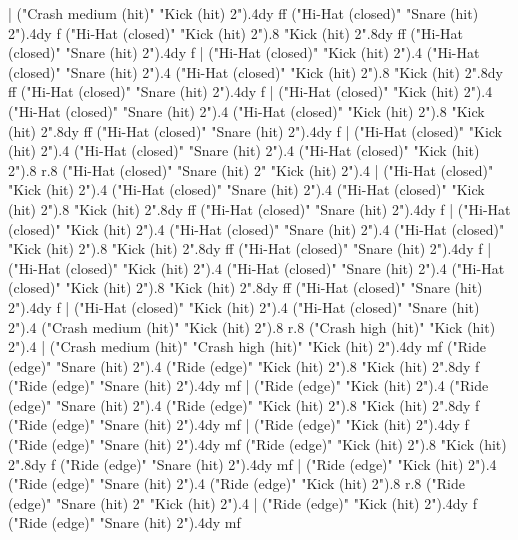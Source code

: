     |
      ("Crash medium (hit)" "Kick (hit) 2").4{dy ff}
      ("Hi-Hat (closed)" "Snare (hit) 2").4{dy f}
      ("Hi-Hat (closed)" "Kick (hit) 2").8
      "Kick (hit) 2".8{dy ff}
      ("Hi-Hat (closed)" "Snare (hit) 2").4{dy f}
    |
      ("Hi-Hat (closed)" "Kick (hit) 2").4
      ("Hi-Hat (closed)" "Snare (hit) 2").4
      ("Hi-Hat (closed)" "Kick (hit) 2").8
      "Kick (hit) 2".8{dy ff}
      ("Hi-Hat (closed)" "Snare (hit) 2").4{dy f}
    |
      ("Hi-Hat (closed)" "Kick (hit) 2").4
      ("Hi-Hat (closed)" "Snare (hit) 2").4
      ("Hi-Hat (closed)" "Kick (hit) 2").8
      "Kick (hit) 2".8{dy ff}
      ("Hi-Hat (closed)" "Snare (hit) 2").4{dy f}
    |
      ("Hi-Hat (closed)" "Kick (hit) 2").4
      ("Hi-Hat (closed)" "Snare (hit) 2").4
      ("Hi-Hat (closed)" "Kick (hit) 2").8
      r.8
      ("Hi-Hat (closed)" "Snare (hit) 2" "Kick (hit) 2").4
    |
      ("Hi-Hat (closed)" "Kick (hit) 2").4
      ("Hi-Hat (closed)" "Snare (hit) 2").4
      ("Hi-Hat (closed)" "Kick (hit) 2").8
      "Kick (hit) 2".8{dy ff}
      ("Hi-Hat (closed)" "Snare (hit) 2").4{dy f}
    |
      ("Hi-Hat (closed)" "Kick (hit) 2").4
      ("Hi-Hat (closed)" "Snare (hit) 2").4
      ("Hi-Hat (closed)" "Kick (hit) 2").8
      "Kick (hit) 2".8{dy ff}
      ("Hi-Hat (closed)" "Snare (hit) 2").4{dy f}
    |
      ("Hi-Hat (closed)" "Kick (hit) 2").4
      ("Hi-Hat (closed)" "Snare (hit) 2").4
      ("Hi-Hat (closed)" "Kick (hit) 2").8
      "Kick (hit) 2".8{dy ff}
      ("Hi-Hat (closed)" "Snare (hit) 2").4{dy f}
    |
      ("Hi-Hat (closed)" "Kick (hit) 2").4
      ("Hi-Hat (closed)" "Snare (hit) 2").4
      ("Crash medium (hit)" "Kick (hit) 2").8
      r.8
      ("Crash high (hit)" "Kick (hit) 2").4
    |
      ("Crash medium (hit)" "Crash high (hit)" "Kick (hit) 2").4{dy mf}
      ("Ride (edge)" "Snare (hit) 2").4
      ("Ride (edge)" "Kick (hit) 2").8
      "Kick (hit) 2".8{dy f}
      ("Ride (edge)" "Snare (hit) 2").4{dy mf}
    |
      ("Ride (edge)" "Kick (hit) 2").4
      ("Ride (edge)" "Snare (hit) 2").4
      ("Ride (edge)" "Kick (hit) 2").8
      "Kick (hit) 2".8{dy f}
      ("Ride (edge)" "Snare (hit) 2").4{dy mf}
    |
      ("Ride (edge)" "Kick (hit) 2").4{dy f}
      ("Ride (edge)" "Snare (hit) 2").4{dy mf}
      ("Ride (edge)" "Kick (hit) 2").8
      "Kick (hit) 2".8{dy f}
      ("Ride (edge)" "Snare (hit) 2").4{dy mf}
    |
      ("Ride (edge)" "Kick (hit) 2").4
      ("Ride (edge)" "Snare (hit) 2").4
      ("Ride (edge)" "Kick (hit) 2").8
      r.8
      ("Ride (edge)" "Snare (hit) 2" "Kick (hit) 2").4
    |
      ("Ride (edge)" "Kick (hit) 2").4{dy f}
      ("Ride (edge)" "Snare (hit) 2").4{dy mf}
